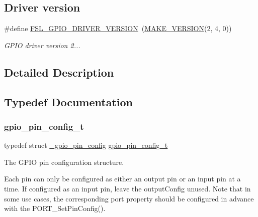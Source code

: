 \subsection*{Driver version}
\begin{DoxyCompactItemize}
\item 
\mbox{\label{group__gpio_ga5aa5229cbd041b11bcf8417ba12896b2}} 
\#define \mbox{\hyperlink{group__gpio_ga5aa5229cbd041b11bcf8417ba12896b2}{F\+S\+L\+\_\+\+G\+P\+I\+O\+\_\+\+D\+R\+I\+V\+E\+R\+\_\+\+V\+E\+R\+S\+I\+ON}}~(\mbox{\hyperlink{group__ftfx__utilities_ga812138aa3315b0c6953c1a26130bcc37}{M\+A\+K\+E\+\_\+\+V\+E\+R\+S\+I\+ON}}(2, 4, 0))
\begin{DoxyCompactList}\small\item\em G\+P\+IO driver version 2... \end{DoxyCompactList}\end{DoxyCompactItemize}


\subsection{Detailed Description}


\subsection{Typedef Documentation}
\mbox{\label{group__gpio_ga9279df0a87f2432dc3c5d596028223b7}} 
\subsubsection{\texorpdfstring{gpio\_pin\_config\_t}{gpio\_pin\_config\_t}}
{\footnotesize\ttfamily typedef struct \mbox{\hyperlink{struct__gpio__pin__config}{\+\_\+gpio\+\_\+pin\+\_\+config}}  \mbox{\hyperlink{group__gpio_ga9279df0a87f2432dc3c5d596028223b7}{gpio\+\_\+pin\+\_\+config\+\_\+t}}}



The G\+P\+IO pin configuration structure. 

Each pin can only be configured as either an output pin or an input pin at a time. If configured as an input pin, leave the output\+Config unused. Note that in some use cases, the corresponding port property should be configured in advance with the P\+O\+R\+T\+\_\+\+Set\+Pin\+Config(). 

